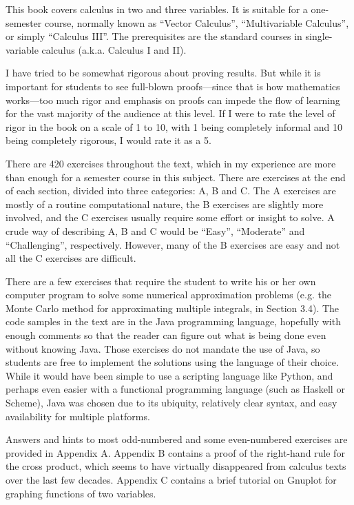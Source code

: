 This book covers calculus in two and three variables. It is suitable for a one-semester course, normally known as
``Vector Calculus'', ``Multivariable Calculus'', or simply ``Calculus III''. The prerequisites are the standard courses
in single-variable calculus (a.k.a. Calculus I and II).

I have tried to be somewhat rigorous about proving results. But while it is important for students to
see full-blown proofs---since that is how mathematics works---too much rigor and emphasis on proofs
can impede the flow
of learning for the vast majority of the audience at this level. If I were to rate the level of rigor in the book on a
scale of 1 to 10, with 1 being completely informal and 10 being completely rigorous, I would rate it as a 5.

There are 420 exercises throughout the text, which in my experience are more than enough for a semester course in
this subject.
There are exercises at the end of each section, divided into three categories: A, B and C. The A exercises are mostly
of a routine computational nature, the B exercises are slightly more involved, and the C exercises usually require
some effort or insight to solve. A crude way of describing A, B and C would be ``Easy'', ``Moderate'' and ``Challenging'', respectively. 
However, many of the B exercises are easy and not all
the C exercises are difficult.

There are a few exercises that require the student to write his or her own computer program
to solve some numerical approximation problems (e.g. the Monte Carlo method for approximating multiple integrals, in
Section 3.4).
The code samples in the text are in the Java programming language, hopefully with enough comments so that the reader can
figure out what is being done even without knowing Java. Those exercises do not mandate the use of Java, so
students are free to implement the solutions using the language of their choice. While it would have been simple to
use a scripting language like Python, and perhaps even easier with a functional programming language (such as Haskell or Scheme), 
Java was chosen due to its ubiquity, relatively clear syntax, and easy availability for multiple platforms.

Answers and hints to most odd-numbered and some even-numbered exercises are
provided in Appendix A. Appendix B contains a proof of the right-hand rule for the cross product, which seems to have
virtually disappeared from calculus texts
over the last few decades. Appendix C contains a brief tutorial on Gnuplot for graphing functions of two variables.

